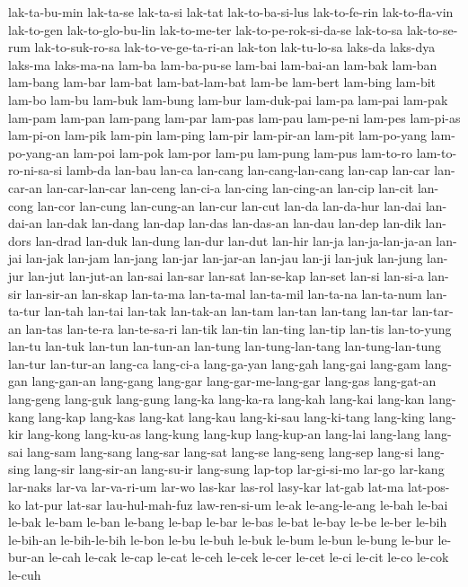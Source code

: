 {lak-ta-bu-min lak-ta-se lak-ta-si lak-tat lak-to-ba-si-lus lak-to-fe-rin
lak-to-fla-vin lak-to-gen lak-to-glo-bu-lin lak-to-me-ter
lak-to-pe-rok-si-da-se lak-to-sa lak-to-se-rum lak-to-suk-ro-sa
lak-to-ve-ge-ta-ri-an lak-ton lak-tu-lo-sa laks-da laks-dya laks-ma
laks-ma-na lam-ba lam-ba-pu-se lam-bai lam-bai-an lam-bak lam-ban lam-bang
lam-bar lam-bat lam-bat-lam-bat lam-be lam-bert lam-bing lam-bit lam-bo
lam-bu lam-buk lam-bung lam-bur lam-duk-pai lam-pa lam-pai lam-pak lam-pam
lam-pan lam-pang lam-par lam-pas lam-pau lam-pe-ni lam-pes lam-pi-as
lam-pi-on lam-pik lam-pin lam-ping lam-pir lam-pir-an lam-pit lam-po-yang
lam-po-yang-an lam-poi lam-pok lam-por lam-pu lam-pung lam-pus lam-to-ro
lam-to-ro-ni-sa-si lamb-da lan-bau lan-ca lan-cang lan-cang-lan-cang
lan-cap lan-car lan-car-an lan-car-lan-car lan-ceng lan-ci-a lan-cing
lan-cing-an lan-cip lan-cit lan-cong lan-cor lan-cung lan-cung-an lan-cur
lan-cut lan-da lan-da-hur lan-dai lan-dai-an lan-dak lan-dang lan-dap
lan-das lan-das-an lan-dau lan-dep lan-dik lan-dors lan-drad lan-duk
lan-dung lan-dur lan-dut lan-hir lan-ja lan-ja-lan-ja-an lan-jai lan-jak
lan-jam lan-jang lan-jar lan-jar-an lan-jau lan-ji lan-juk lan-jung
lan-jur lan-jut lan-jut-an lan-sai lan-sar lan-sat lan-se-kap lan-set
lan-si lan-si-a lan-sir lan-sir-an lan-skap lan-ta-ma lan-ta-mal
lan-ta-mil lan-ta-na lan-ta-num lan-ta-tur lan-tah lan-tai lan-tak
lan-tak-an lan-tam lan-tan lan-tang lan-tar lan-tar-an lan-tas lan-te-ra
lan-te-sa-ri lan-tik lan-tin lan-ting lan-tip lan-tis lan-to-yung lan-tu
lan-tuk lan-tun lan-tun-an lan-tung lan-tung-lan-tang lan-tung-lan-tung
lan-tur lan-tur-an lang-ca lang-ci-a lang-ga-yan lang-gah lang-gai
lang-gam lang-gan lang-gan-an lang-gang lang-gar lang-gar-me-lang-gar
lang-gas lang-gat-an lang-geng lang-guk lang-gung lang-ka lang-ka-ra
lang-kah lang-kai lang-kan lang-kang lang-kap lang-kas lang-kat lang-kau
lang-ki-sau lang-ki-tang lang-king lang-kir lang-kong lang-ku-as lang-kung
lang-kup lang-kup-an lang-lai lang-lang lang-sai lang-sam lang-sang
lang-sar lang-sat lang-se lang-seng lang-sep lang-si lang-sing lang-sir
lang-sir-an lang-su-ir lang-sung lap-top lar-gi-si-mo lar-go lar-kang
lar-naks lar-va lar-va-ri-um lar-wo las-kar las-rol lasy-kar lat-gab
lat-ma lat-pos-ko lat-pur lat-sar lau-hul-mah-fuz law-ren-si-um le-ak
le-ang-le-ang le-bah le-bai le-bak le-bam le-ban le-bang le-bap le-bar
le-bas le-bat le-bay le-be le-ber le-bih le-bih-an le-bih-le-bih le-bon
le-bu le-buh le-buk le-bum le-bun le-bung le-bur le-bur-an le-cah le-cak
le-cap le-cat le-ceh le-cek le-cer le-cet le-ci le-cit le-co le-cok le-cuh
}
